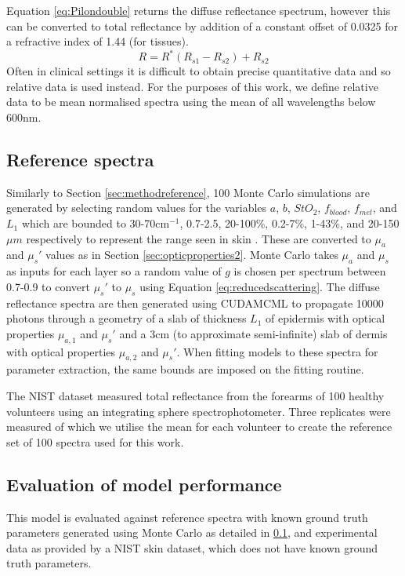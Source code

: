 Equation \ref{eq:Pilondouble} returns the diffuse reflectance spectrum, however this can be converted to total reflectance by addition of a constant offset of 0.0325 for a refractive index of 1.44 (for tissues)\cite{Yudovsky2011a}.
\begin{equation}
    R = R^*(R_{s1} - R_{s2}) + R_{s2}
\label{eq:Pilondouble}
\end{equation}
Often in clinical settings it is difficult to obtain precise quantitative data and so relative data is used instead\cite{Bahl2023}. For the purposes of this work, we define relative data to be mean normalised spectra using the mean of all wavelengths below 600nm. 

\subsection{Reference spectra}\label{sec:methodreference2}
Similarly to Section \ref{sec:methodreference}, 100 Monte Carlo simulations are generated by selecting random values for the variables $a$, $b$, $StO_2$, $f_{blood}$, $f_{mel}$, and $L_1$ which are bounded to 30-70cm\textrm{$^{-1}$}, 0.7-2.5, 20-100\%, 0.2-7\%, 1-43\%, and 20-150\textrm{$\mu m$} respectively to represent the range seen in skin \cite{Jacques2013, Yudovsky2009}. These are converted to $\mu_a$ and $\mu_s'$ values as in Section \ref{sec:opticproperties2}. Monte Carlo takes $\mu_a$ and $\mu_s$ as inputs for each layer so a random value of $g$ is chosen per spectrum between 0.7-0.9 to convert $\mu_s'$ to $\mu_s$ using Equation \ref{eq:reducedscattering}. The diffuse reflectance spectra are then generated using CUDAMCML\cite{Alerstam2008} to propagate 10000 photons through a geometry of a slab of thickness $L_1$ of epidermis with optical properties $\mu_{a,1}$ and $\mu_s'$ and a 3cm (to approximate semi-infinite) slab of dermis with optical properties $\mu_{a, 2}$ and $\mu_s'$. When fitting models to these spectra for parameter extraction, the same bounds are imposed on the fitting routine. 

The NIST dataset measured total reflectance from the forearms of 100 healthy volunteers using an integrating sphere spectrophotometer\cite{Cooksey2017}. Three replicates were measured of which we utilise the mean for each volunteer to create the reference set of 100 spectra used for this work. 
\FloatBarrier

\subsection{Evaluation of model performance}\label{sec:methodevaluate2}
This model is evaluated against reference spectra with known ground truth parameters generated using Monte Carlo as detailed in \ref{sec:methodreference2}, and experimental data as provided by a NIST skin dataset\cite{Cooksey2017}, which does not have known ground truth parameters. 

